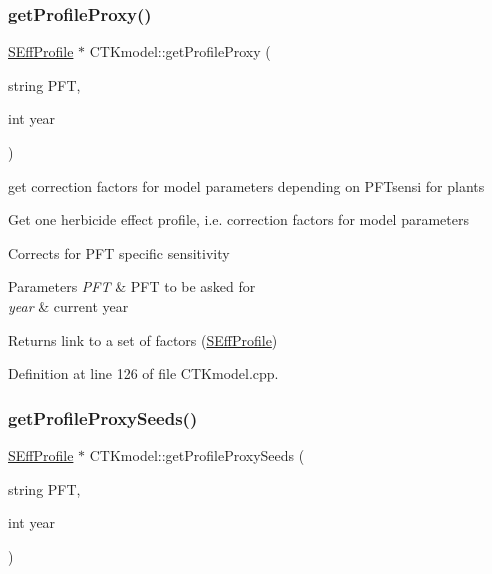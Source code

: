 \subsubsection{\texorpdfstring{getProfileProxy()}{getProfileProxy()}}
{\footnotesize\ttfamily \mbox{\hyperlink{struct_s_eff_profile}{S\+Eff\+Profile}} $\ast$ C\+T\+Kmodel\+::get\+Profile\+Proxy (\begin{DoxyParamCaption}\item[{string}]{P\+FT,  }\item[{int}]{year }\end{DoxyParamCaption})\hspace{0.3cm}{\ttfamily [protected]}}



get correction factors for model parameters depending on P\+F\+Tsensi for plants 

Get one herbicide effect profile, i.\+e. correction factors for model parameters

Corrects for P\+FT specific sensitivity 
\begin{DoxyParams}{Parameters}
{\em P\+FT} & P\+FT to be asked for \\
\hline
{\em year} & current year \\
\hline
\end{DoxyParams}
\begin{DoxyReturn}{Returns}
link to a set of factors (\mbox{\hyperlink{struct_s_eff_profile}{S\+Eff\+Profile}}) 
\end{DoxyReturn}


Definition at line 126 of file C\+T\+Kmodel.\+cpp.

\mbox{\label{class_c_t_kmodel_a561adaf724a7bdf1f55b509aec457c96}} 
\subsubsection{\texorpdfstring{getProfileProxySeeds()}{getProfileProxySeeds()}}
{\footnotesize\ttfamily \mbox{\hyperlink{struct_s_eff_profile}{S\+Eff\+Profile}} $\ast$ C\+T\+Kmodel\+::get\+Profile\+Proxy\+Seeds (\begin{DoxyParamCaption}\item[{string}]{P\+FT,  }\item[{int}]{year }\end{DoxyParamCaption})\hspace{0.3cm}{\ttfamily [protected]}}



